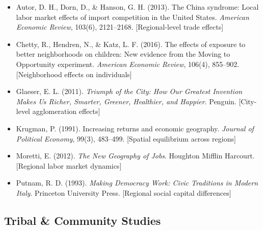 \begin{itemize}

\item Autor, D. H., Dorn, D., \& Hanson, G. H. (2013). 
The China syndrome: Local labor market effects of import competition in the United States. 
\textit{American Economic Review}, 103(6), 2121--2168.
[Regional-level trade effects]

\item Chetty, R., Hendren, N., \& Katz, L. F. (2016). 
The effects of exposure to better neighborhoods on children: New evidence from the Moving to Opportunity experiment. 
\textit{American Economic Review}, 106(4), 855--902.
[Neighborhood effects on individuals]

\item Glaeser, E. L. (2011). 
\textit{Triumph of the City: How Our Greatest Invention Makes Us Richer, Smarter, Greener, Healthier, and Happier}. 
Penguin.
[City-level agglomeration effects]

\item Krugman, P. (1991). 
Increasing returns and economic geography. 
\textit{Journal of Political Economy}, 99(3), 483--499.
[Spatial equilibrium across regions]

\item Moretti, E. (2012). 
\textit{The New Geography of Jobs}. 
Houghton Mifflin Harcourt.
[Regional labor market dynamics]

\item Putnam, R. D. (1993). 
\textit{Making Democracy Work: Civic Traditions in Modern Italy}. 
Princeton University Press.
[Regional social capital differences]

\end{itemize}

\subsection*{Tribal \& Community Studies}

